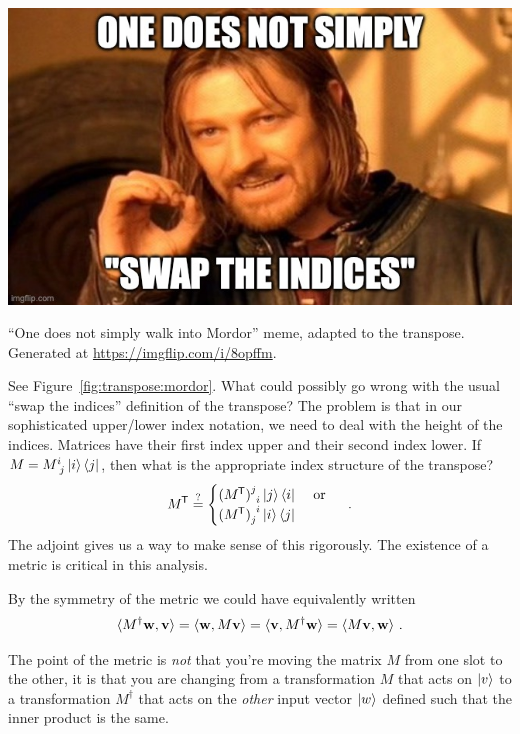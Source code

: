 \documentclass[12pt, oneside]{report}    %
\begin{document}
\begin{marginfigure}%
    \includegraphics[width=\textwidth]{figures/MordorIndices.jpg}
    \caption{``One does not simply walk into Mordor'' meme, adapted to the transpose. Generated at \url{https://imgflip.com/i/8opffm}.}
    \label{fig:transpose:mordor}
\end{marginfigure}
\begin{example} See Figure~\ref{fig:transpose:mordor}. What could possibly go wrong with the usual ``swap the indices'' definition of the transpose? The problem is that in our sophisticated upper/lower index notation, we need to deal with the height of the indices. Matrices have their first index upper and their second index lower. If $M=M\aij{i}{j}\ket{i}\bra{j}$, then what is the appropriate index structure of the transpose?
\begin{align}
    M^\trans \stackrel{?}{=} 
    \begin{cases}
    (M^\trans)\aij{j}{i}\ket{j}\bra{i}    & \text{ or }\\
    (M^\trans)_{j}^{\phantom{j}i}\ket{i}\bra{j}
    \end{cases}
    \quad\text{.}
\end{align}
The adjoint gives us a way to make sense of this rigorously. The existence of a metric is critical in this analysis. 
\end{example}

\begin{example}
By the symmetry of the metric we could have equivalently written
\begin{align}
    \langle M^\dag \mathbf{w}, \mathbf{v} \rangle =
    \langle \mathbf{w} ,  M \mathbf{v} \rangle =
    \langle \mathbf{v}, M^\dag \mathbf{w} \rangle =
    \langle M \mathbf{v}, \mathbf{w} \rangle 
    \ .
\end{align}


The point of the metric is \emph{not} that you're moving the matrix $M$ from one slot to the other, it is that you are changing from a transformation $M$ that acts on $\left|v\right\rangle$ to a transformation $M^\dag$ that acts on the \emph{other} input vector $\left|w\right\rangle$ defined such that the inner product is the same.
\end{example}
\end{document}
